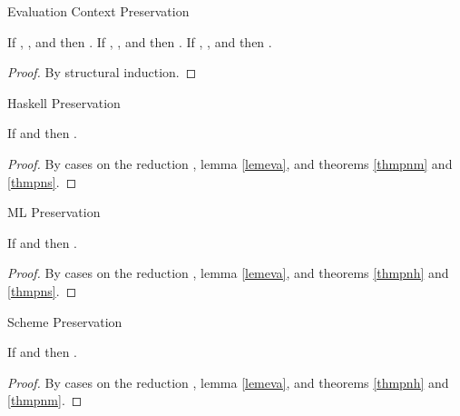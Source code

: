 \begin{lemma}{Evaluation Context Preservation}

\label{lemeva}
If \judeh{}{\first{\varexph}}{\first{\vartyh}}, \judeh{}{\second{\varexph}}{\first{\vartyh}}, and \judeh{}{\redconh{\first{\varexph}}}{\second{\vartyh}} then \judeh{}{\redconh{\second{\varexph}}}{\second{\vartyh}}.
If \judem{}{\first{\varexpm}}{\first{\vartym}}, \judem{}{\second{\varexpm}}{\first{\vartym}}, and \judem{}{\redconm{\first{\varexpm}}}{\second{\vartym}} then \judem{}{\redconm{\second{\varexpm}}}{\second{\vartym}}.
If \judes{}{\first{\varexps}}{\tytst}, \judes{}{\second{\varexps}}{\tytst}, and \judes{}{\redcons{\first{\varexps}}}{\tytst} then \judes{}{\redcons{\second{\varexps}}}{\tytst}.
\begin{proof}
By structural induction.
\end{proof}
\end{lemma}

\begin{theorem}{Haskell Preservation}

\label{thmpnh}
If \judeh{\env}{\first{\varexph}}{\first{\vartyh}} and \redruleh{\first{\varexph}}{\second{\varexph}} then \judeh{\env}{\second{\varexph}}{\first{\vartyh}}.
\begin{proof}
By cases on the reduction \redruleh{\first{\varexph}}{\second{\varexph}}, lemma \ref{lemeva}, and theorems \ref{thmpnm} and \ref{thmpns}.
\end{proof}
\end{theorem}

\begin{theorem}{ML Preservation}

\label{thmpnm}
If \judem{\env}{\first{\varexpm}}{\first{\vartym}} and \first{\varexpm} \red \second{\varexpm} then \judem{\env}{\second{\varexpm}}{\first{\vartym}}.
\begin{proof}
By cases on the reduction \redruleh{\first{\varexpm}}{\second{\varexpm}}, lemma \ref{lemeva}, and theorems \ref{thmpnh} and \ref{thmpns}.
\end{proof}
\end{theorem}

\begin{theorem}{Scheme Preservation}

\label{thmpns}
If \judes{\env}{\first{\varexps}}{\tytst} and \first{\varexps} \red \second{\varexps} then \judes{\env}{\second{\varexps}}{\tytst}.
\begin{proof}
By cases on the reduction \redrules{\first{\varexps}}{\second{\varexps}}, lemma \ref{lemeva}, and theorems \ref{thmpnh} and \ref{thmpnm}.
\end{proof}
\end{theorem}